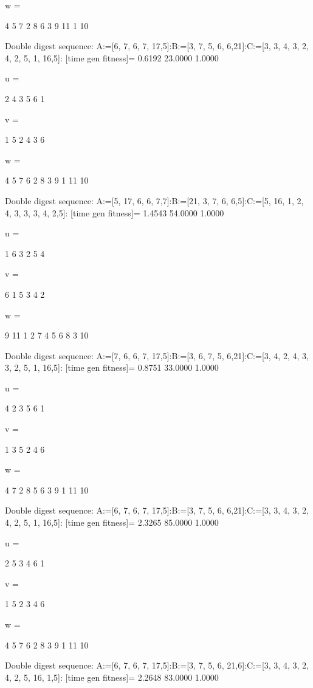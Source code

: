 w =

     4     5     7     2     8     6     3     9    11     1    10

Double digest sequence:
A:=[6, 7, 6, 7, 17,5]:B:=[3, 7, 5, 6, 6,21]:C:=[3, 3, 4, 3, 2, 4, 2, 5, 1, 16,5]:
[time gen fitness]=
    0.6192   23.0000    1.0000


u =

     2     4     3     5     6     1


v =

     1     5     2     4     3     6


w =

     4     5     7     6     2     8     3     9     1    11    10

Double digest sequence:
A:=[5, 17, 6, 6, 7,7]:B:=[21, 3, 7, 6, 6,5]:C:=[5, 16, 1, 2, 4, 3, 3, 3, 4, 2,5]:
[time gen fitness]=
    1.4543   54.0000    1.0000


u =

     1     6     3     2     5     4


v =

     6     1     5     3     4     2


w =

     9    11     1     2     7     4     5     6     8     3    10

Double digest sequence:
A:=[7, 6, 6, 7, 17,5]:B:=[3, 6, 7, 5, 6,21]:C:=[3, 4, 2, 4, 3, 3, 2, 5, 1, 16,5]:
[time gen fitness]=
    0.8751   33.0000    1.0000


u =

     4     2     3     5     6     1


v =

     1     3     5     2     4     6


w =

     4     7     2     8     5     6     3     9     1    11    10

Double digest sequence:
A:=[6, 7, 6, 7, 17,5]:B:=[3, 7, 5, 6, 6,21]:C:=[3, 3, 4, 3, 2, 4, 2, 5, 1, 16,5]:
[time gen fitness]=
    2.3265   85.0000    1.0000


u =

     2     5     3     4     6     1


v =

     1     5     2     3     4     6


w =

     4     5     7     6     2     8     3     9     1    11    10

Double digest sequence:
A:=[6, 7, 6, 7, 17,5]:B:=[3, 7, 5, 6, 21,6]:C:=[3, 3, 4, 3, 2, 4, 2, 5, 16, 1,5]:
[time gen fitness]=
    2.2648   83.0000    1.0000


